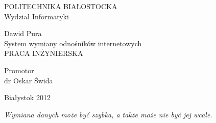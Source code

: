 \begin{titlepage}
	\begin{center}
	\vspace{3cm}
	\fontsize{25pt}{31pt}\selectfont
	POLITECHNIKA BIAŁOSTOCKA \\
	\vspace*{.5\baselineskip}
	\fontsize{24pt}{18pt}\selectfont
	Wydział Informatyki

	\vspace*{3\baselineskip}
	\fontsize{32pt}{20pt}\selectfont
	Dawid Pura\\
	\vspace*{\baselineskip}
	\fontsize{20pt}{15pt}\selectfont
	System wymiany odnośników internetowych\\
	\vspace*{\baselineskip}
	\fontsize{15pt}{18pt}\selectfont
	PRACA INŻYNIERSKA \\
	\end{center}
	\vspace*{\baselineskip}
	\vspace*{3\baselineskip}
	\begin{flushright}
	\fontsize{18pt}{10pt}\selectfont
	Promotor\\
	dr Oskar Świda\\
	\end{flushright}
	
	\vspace*{4\baselineskip}
	\begin{center}
	Białystok 2012
	\end{center}

%
%
%
%
\textit{Wymiana danych może być szybka, a także może nie być jej wcale.}
%
%

\end{titlepage}

